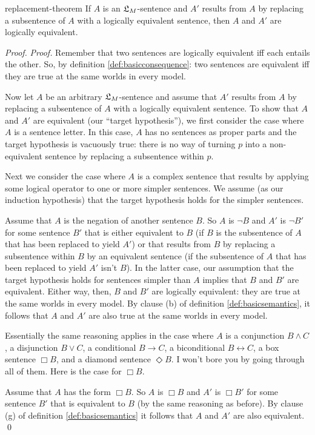 \begin{observation}{replacement-theorem}
  If $A$ is an $\mathfrak{L}_{M}$-sentence and $A'$ results from $A$ by replacing a
  subsentence of $A$ with a logically equivalent sentence, then $A$ and $A'$ are
  logically equivalent.
\end{observation}
\begin{proof}
  \emph{Proof.} Remember that two sentences are logically equivalent iff each
  entails the other. So, by definition \ref{def:basicconsequence}: two sentences
  are equivalent iff they are true at the same worlds in every model.

  Now let $A$ be an arbitrary $\mathfrak{L}_{M}$-sentence and assume that $A'$ results
  from $A$ by replacing a subsentence of $A$ with a logically equivalent
  sentence. To show that $A$ and $A'$ are equivalent (our ``target hypothesis''), we first consider the case
  where $A$ is a sentence letter. In this case, $A$ has no sentences as proper
  parts and the target hypothesis is vacuously true: there is no way of turning
  $p$ into a non-equivalent sentence by replacing a subsentence within $p$.

  Next we consider the case where $A$ is a complex sentence that results by
  applying some logical operator to one or more simpler sentences. We assume (as
  our induction hypothesis) that the target hypothesis holds for the simpler
  sentences.

  Assume that $A$ is the negation of another sentence $B$. So $A$ is $\neg B$
  and $A'$ is $\neg B'$ for some sentence $B'$ that is either equivalent to $B$
  (if $B$ is the subsentence of $A$ that has been replaced to yield $A'$) or
  that results from $B$ by replacing a subsentence within $B$ by an equivalent
  sentence (if the subsentence of $A$ that has been replaced to yield $A'$ isn't
  $B$). In the latter case, our assumption that the target hypothesis holds for
  sentences simpler than $A$ implies that $B$ and $B'$ are equivalent. Either
  way, then, $B$ and $B'$ are logically equivalent: they are true at the same
  worlds in every model. By clause (b) of definition \ref{def:basicsemantics},
  it follows that $A$ and $A'$ are also true at the same worlds in every model.

  Essentially the same reasoning applies in the case where $A$ is a conjunction
  $B \land C$, a disjunction $B \lor C$, a conditional $B \to C$, a
  biconditional $B \leftrightarrow C$, a box sentence $\Box B$, and a diamond
  sentence $\Diamond B$. I won't bore you by going through all of them. Here is
  the case for $\Box B$.
  
  Assume that $A$ has the form $\Box B$. So $A$ is $\Box B$ and $A'$ is
  $\Box B'$ for some sentence $B'$ that is equivalent to $B$ (by the same
  reasoning as before). By clause (g) of definition \ref{def:basicsemantics} it
  follows that $A$ and $A'$ are also equivalent. \qed

\end{proof}


